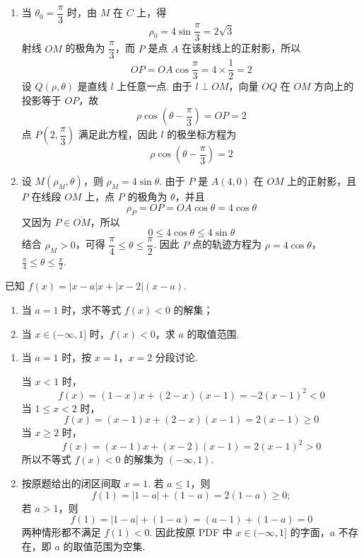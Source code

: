 \begin{solution}
\begin{enumerate}
\item 当 \(\theta_0=\dfrac\pi3\) 时，由 \(M\) 在 \(C\) 上，得
\[
\rho_0=4\sin\frac\pi3=2\sqrt3
\]
射线 \(OM\) 的极角为 \(\dfrac\pi3\)，而 \(P\) 是点 \(A\) 在该射线上的正射影，所以
\[
OP=OA\cos\frac\pi3=4\times\frac12=2
\]
设 \(Q(\rho,\theta)\) 是直线 \(l\) 上任意一点. 由于 \(l\perp OM\)，向量 \(OQ\) 在 \(OM\) 方向上的投影等于 \(OP\)，故
\[
\rho\cos\left(\theta-\frac\pi3\right)=OP=2
\]
点 \(P\left(2,\dfrac\pi3\right)\) 满足此方程，因此 \(l\) 的极坐标方程为
\[
\rho\cos\left(\theta-\frac\pi3\right)=2
\]

\item 设 \(M(\rho_M,\theta)\)，则 \(\rho_M=4\sin\theta\). 由于 \(P\) 是 \(A(4,0)\) 在 \(OM\) 上的正射影，且 \(P\) 在线段 \(OM\) 上，点 \(P\) 的极角为 \(\theta\)，并且
\[
\rho_P=OP=OA\cos\theta=4\cos\theta
\]
又因为 \(P\in\overline{OM}\)，所以
\[
0\le4\cos\theta\le4\sin\theta
\]
结合 \(\rho_M>0\)，可得 \(\dfrac\pi4\le\theta\le\dfrac\pi2\). 因此 \(P\) 点的轨迹方程为
\(\rho=4\cos\theta\)，\(\frac\pi4\le\theta\le\frac\pi2\).
\end{enumerate}
\end{solution}

\begin{problem}
已知 \(f(x)=|x-a|x+|x-2|(x-a)\).

\begin{enumerate}
\item 当 \(a=1\) 时，求不等式 \(f(x)<0\) 的解集；
\item 当 \(x\in(-\infty,1]\) 时，\(f(x)<0\)，求 \(a\) 的取值范围.
\end{enumerate}
\end{problem}

\begin{solution}
\begin{enumerate}
\item 当 \(a=1\) 时，按 \(x=1\)，\(x=2\) 分段讨论.

当 \(x<1\) 时，
\[
f(x)=(1-x)x+(2-x)(x-1)=-2(x-1)^2<0
\]
当 \(1\le x<2\) 时，
\[
f(x)=(x-1)x+(2-x)(x-1)=2(x-1)\ge0
\]
当 \(x\ge2\) 时，
\[
f(x)=(x-1)x+(x-2)(x-1)=2(x-1)^2>0
\]
所以不等式 \(f(x)<0\) 的解集为 \((-\infty,1)\).

\item 按原题给出的闭区间取 \(x=1\). 若 \(a\le1\)，则
\[
f(1)=|1-a|+(1-a)=2(1-a)\ge0;
\]
若 \(a>1\)，则
\[
f(1)=|1-a|+(1-a)=(a-1)+(1-a)=0
\]
两种情形都不满足 \(f(1)<0\). 因此按原 PDF 中 \(x\in(-\infty,1]\) 的字面，\(a\) 不存在，即 \(a\) 的取值范围为空集.
\end{enumerate}
\end{solution}
